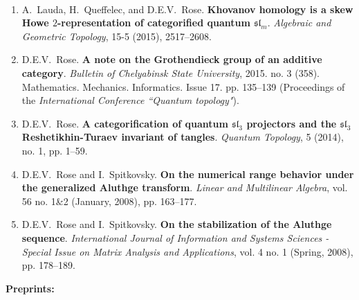 \documentclass[10pt]{article}
\begin{document}
\begin{enumerate}
\item 
A.~Lauda, H.~Queffelec\textsuperscript{\textdagger}, and D.E.V.~Rose.
{\bf Khovanov homology is a skew Howe $2$-representation of categorified quantum $\mathfrak{sl}_m$}.
\emph{Algebraic and Geometric Topology}, 15-5 (2015), 2517--2608. %

\item 
D.E.V.~Rose.
{\bf A note on the Grothendieck group of an additive category}.
\emph{Bulletin of Chelyabinsk State University}, 2015. no. 3 (358). 
Mathematics. Mechanics. Informatics. Issue 17. pp. 135--139 %
(Proceedings of the {\it International Conference ``Quantum topology"}).
 
\item 
D.E.V.~Rose.
{\bf A categorification of quantum $\mathfrak{sl}_3$ projectors and the $\mathfrak{sl}_3$ 
Reshetikhin-Turaev invariant of tangles}.
\emph{Quantum Topology}, 5 (2014), no. 1, pp. 1--59. %
 
\item
D.E.V.~Rose and I.~Spitkovsky.
{\bf On the numerical range behavior under the generalized Aluthge transform}.
\emph{Linear and Multilinear Algebra}, vol. 56 no. 1\&2 (January, 2008), pp. 163--177. %
 
\item 
D.E.V.~Rose and I.~Spitkovsky.
{\bf On the stabilization of the Aluthge sequence}.
\emph{International Journal of Information and Systems Sciences - 
Special Issue on Matrix Analysis and Applications}, 
vol. 4 no. 1 (Spring, 2008), pp. 178--189. %
\end{enumerate}

\noindent\textbf{Preprints:}
\end{document}
